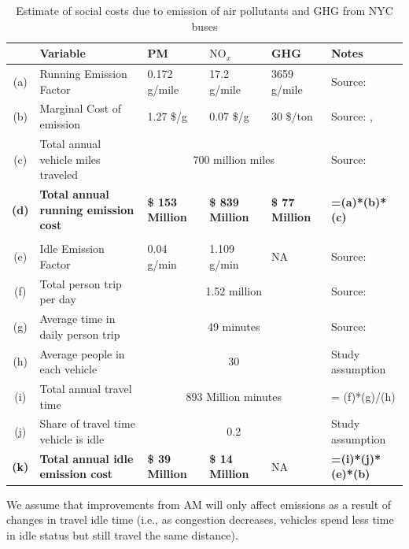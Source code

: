 \documentclass[11pt, letterpaper]{article}
\begin{document}
\begin{enumerate}[leftmargin=*]
\begin{table}[h]
\caption{Estimate of social costs due to emission of air pollutants and GHG from NYC buses}
\vspace{0.2em}
\centering
\footnotesize 
\renewcommand{\arraystretch}{1.1}
\begin{tabular}{c | m{10em} | m{7em} | m{7em} | m{7em} | l}
\hline
 	& Variable 							& PM 	& $\mbox{NO}_x$	& GHG		& Notes 						\\\hline\hline
(a)	& Running Emission Factor				& 0.172 g/mile	& 17.2 g/mile	& 3659 g/mile	& Source: \cite{busemission} \\
(b)	& Marginal Cost of emission				& 1.27 \$/g	& 0.07 \$/g	& 30 \$/ton	& Source:	\cite{EIA}, \cite{EASIUR}					\\
(c)	& Total annual vehicle miles traveled			& \multicolumn{3}{c|}{700 million miles}		& Source:	\cite{nyctransit}					\\
\textbf{(d)}	& \textbf{Total annual running emission cost}	& \textbf{\$ 153 Million} & 	 \textbf{\$ 839 Million} & \textbf{\$ 77 Million}		& \textbf{=(a)*(b)*(c)}			\\
& & & & & \\	
(e)	& Idle Emission Factor					& 0.04 g/min & 1.109 g/min	& NA			& Source:	 \cite{busemission}\\
(f)	& Total person trip per day					& \multicolumn{3}{c|}{1.52 million}			& Source:	\cite{nyctransit} \\
(g)	& Average time in daily person trip			& \multicolumn{3}{c|}{49 minutes}			& Source:	\cite{nyctransit}\\
(h)	& Average people in each vehicle			& \multicolumn{3}{c|}{30}					& Study assumption			\\
(i)	& Total annual travel time					& \multicolumn{3}{c|}{893 Million minutes}		& = (f)*(g)/(h)				\\
(j)	& Share of travel time vehicle is idle			& \multicolumn{3}{c|}{0.2}					& Study assumption			\\
\textbf{(k)}	& \textbf{Total annual idle emission cost}	& \textbf{\$ 39 Million} &  \textbf{\$ 14 Million} & NA 	& \textbf{=(i)*(j)*(e)*(b)}	\\\hline
\end{tabular}
\label{tab:emission.cost}
\end{table}%
    
  We assume that improvements from AM will only affect emissions as a result of changes in travel idle time 
  (i.e., as congestion decreases, vehicles spend less time in idle status but still travel the same distance).
  
\end{enumerate}
\end{document}
